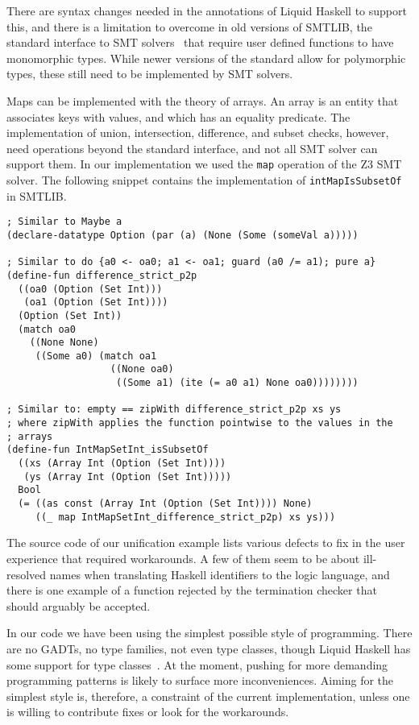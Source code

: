 \documentclass[sigconf, anonymous, review]{acmart}
\newcommand{\tc}[1]{{\small\texttt{#1}}}
\begin{document}
There are syntax changes needed in the annotations of Liquid Haskell to support
this, and there is a limitation to overcome in old versions of SMTLIB, the standard
interface to SMT solvers~\cite{BarFT-RR-25} that require user defined functions to
have monomorphic types. While newer versions of the standard allow for polymorphic
types, these still need to be implemented by SMT solvers.

Maps can be implemented with the theory of arrays. An array is an entity that
associates keys with values, and which has an equality predicate.
The implementation of union, intersection, difference, and subset checks, however,
need operations beyond the standard interface, and not all SMT solver can support
them. In our implementation we used the \tc{map} operation of the
Z3 SMT solver. The following snippet contains the implementation of
\tc{intMapIsSubsetOf} in SMTLIB.

\begin{verbatim}
; Similar to Maybe a
(declare-datatype Option (par (a) (None (Some (someVal a)))))

; Similar to do {a0 <- oa0; a1 <- oa1; guard (a0 /= a1); pure a}
(define-fun difference_strict_p2p
  ((oa0 (Option (Set Int)))
   (oa1 (Option (Set Int))))
  (Option (Set Int))
  (match oa0
    ((None None)
     ((Some a0) (match oa1
                  ((None oa0)
                   ((Some a1) (ite (= a0 a1) None oa0))))))))

; Similar to: empty == zipWith difference_strict_p2p xs ys
; where zipWith applies the function pointwise to the values in the
; arrays
(define-fun IntMapSetInt_isSubsetOf
  ((xs (Array Int (Option (Set Int))))
   (ys (Array Int (Option (Set Int)))))
  Bool
  (= ((as const (Array Int (Option (Set Int)))) None)
     ((_ map IntMapSetInt_difference_strict_p2p) xs ys)))
\end{verbatim}

The source code of our unification example lists various defects to fix
in the user experience that required workarounds. A few of them seem to
be about ill-resolved names when translating Haskell identifiers to the
logic language, and there is one example of a function rejected by the
termination checker that should arguably be accepted.

In our code we have been using the simplest possible style of programming.
There are no GADTs, no type families, not even type classes, though
Liquid Haskell has some support for type classes~\cite{liu20}. At the moment,
pushing for more demanding programming patterns is likely to surface more
inconveniences. Aiming for the simplest style is, therefore, a constraint of
the current implementation, unless one is willing to contribute fixes or
look for the workarounds.
\end{document}
